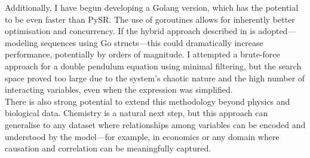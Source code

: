 \documentclass{article}
\begin{document}
Additionally, I have begun developing a Golang version, which has the potential to be even faster than PySR. The use of goroutines allows for inherently better optimisation and concurrency. If the hybrid approach described in \cite{Alnuqaydan2023} is adopted—modeling sequences using Go structs—this could dramatically increase performance, potentially by orders of magnitude. I attempted a brute-force approach for a double pendulum equation using minimal filtering, but the search space proved too large due to the system’s chaotic nature and the high number of interacting variables, even when the expression was simplified. \\

There is also strong potential to extend this methodology beyond physics and biological data. Chemistry is a natural next step, but this approach can generalise to any dataset where relationships among variables can be encoded and understood by the model—for example, in economics or any domain where causation and correlation can be meaningfully captured. \\
\end{document}
